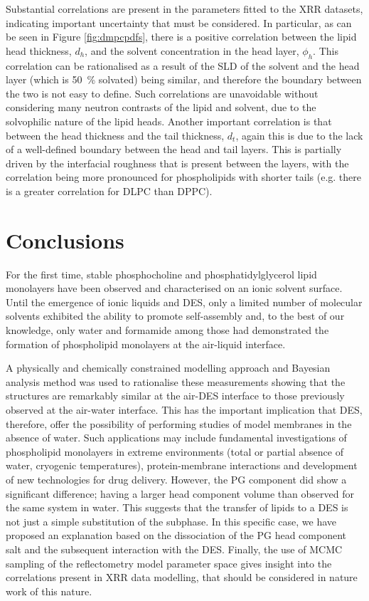 \documentclass[amsmath,amssymb,twocolumn,superscriptaddress]{revtex4-1}
\begin{document}
Substantial correlations are present in the parameters fitted to the XRR datasets, indicating important uncertainty that must be considered.
In particular, as can be seen in Figure \ref{fig:dmpcpdfs}, there is a positive correlation between the lipid head thickness, $d_h$, and the solvent concentration in the head layer, $\phi_h$.
This correlation can be rationalised as a result of the SLD of the solvent and the head layer (which is \SI{50}{\percent} solvated) being similar, and therefore the boundary between the two is not easy to define.
Such correlations are unavoidable without considering many neutron contrasts of the lipid and solvent, due to the solvophilic nature of the lipid heads.
Another important correlation is that between the head thickness and the tail thickness, $d_t$, again this is due to the lack of a well-defined boundary between the head and tail layers.
This is partially driven by the interfacial roughness that is present between the layers, with the correlation being more pronounced for phospholipids with shorter tails (e.g. there is a greater correlation for DLPC than DPPC).

\section{Conclusions}
%
For the first time, stable phosphocholine and phosphatidylglycerol lipid monolayers have been observed and characterised on an ionic solvent surface.
Until the emergence of ionic liquids and DES, only a limited number of molecular solvents exhibited the ability to promote self-assembly and, to the best of our knowledge, only water and formamide among those had demonstrated the formation of phospholipid monolayers at the air-liquid interface.

A physically and chemically constrained modelling approach and Bayesian analysis method was used to rationalise these measurements showing that the structures are remarkably similar at the air-DES interface to those previously observed at the air-water interface.
This has the important implication that DES, therefore, offer the possibility of performing studies of model membranes in the absence of water.
Such applications may include fundamental investigations of phospholipid monolayers in extreme environments (total or partial absence of water, cryogenic temperatures), protein-membrane interactions and development of new technologies for drug delivery.
However, the PG component did show a significant difference; having a larger head component volume than observed for the same system in water.
This suggests that the transfer of lipids to a DES is not just a simple substitution of the subphase.
In this specific case, we have proposed an explanation based on the dissociation of the PG head component salt and the subsequent interaction with the DES.
Finally, the use of MCMC sampling of the reflectometry model parameter space gives insight into the correlations present in XRR data modelling, that should be considered in nature work of this nature.
\end{document}
